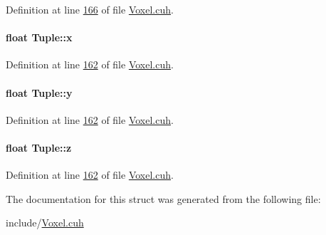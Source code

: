 Definition at line \hyperlink{Voxel_8cuh_source_l00166}{166} of file \hyperlink{Voxel_8cuh_source}{Voxel.\+cuh}.

\paragraph[{\texorpdfstring{x}{x}}]{\setlength{\rightskip}{0pt plus 5cm}float Tuple\+::x}\hypertarget{structTuple_a9355c336c18afa6b76685ddffe16c5a5}{}\label{structTuple_a9355c336c18afa6b76685ddffe16c5a5}


Definition at line \hyperlink{Voxel_8cuh_source_l00162}{162} of file \hyperlink{Voxel_8cuh_source}{Voxel.\+cuh}.

\paragraph[{\texorpdfstring{y}{y}}]{\setlength{\rightskip}{0pt plus 5cm}float Tuple\+::y}\hypertarget{structTuple_ae298b0277eb33e02696b6e3716e93c46}{}\label{structTuple_ae298b0277eb33e02696b6e3716e93c46}


Definition at line \hyperlink{Voxel_8cuh_source_l00162}{162} of file \hyperlink{Voxel_8cuh_source}{Voxel.\+cuh}.

\paragraph[{\texorpdfstring{z}{z}}]{\setlength{\rightskip}{0pt plus 5cm}float Tuple\+::z}\hypertarget{structTuple_a5f83aeb6b110bc956fd27b8e713a9ad5}{}\label{structTuple_a5f83aeb6b110bc956fd27b8e713a9ad5}


Definition at line \hyperlink{Voxel_8cuh_source_l00162}{162} of file \hyperlink{Voxel_8cuh_source}{Voxel.\+cuh}.



The documentation for this struct was generated from the following file\+:\begin{DoxyCompactItemize}
\item 
include/\hyperlink{Voxel_8cuh}{Voxel.\+cuh}\end{DoxyCompactItemize}
